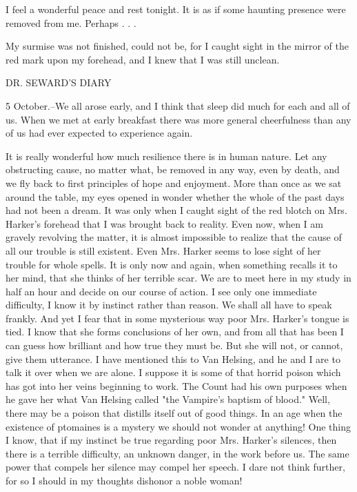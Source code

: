 I feel a wonderful peace and rest tonight. It is as if some haunting presence were removed from me. Perhaps . . . 

My surmise was not finished, could not be, for I caught sight in the mirror of the red mark upon my forehead, and I knew that I was still unclean. 

DR. SEWARD'S DIARY 

5 October.--We all arose early, and I think that sleep did much for each and all of us. When we met at early breakfast there was more general cheerfulness than any of us had ever expected to experience again. 

It is really wonderful how much resilience there is in human nature. Let any obstructing cause, no matter what, be removed in any way, even by death, and we fly back to first principles of hope and enjoyment. More than once as we sat around the table, my eyes opened in wonder whether the whole of the past days had not been a dream. It was only when I caught sight of the red blotch on Mrs. Harker's forehead that I was brought back to reality. Even now, when I am gravely revolving the matter, it is almost impossible to realize that the cause of all our trouble is still existent. Even Mrs. Harker seems to lose sight of her trouble for whole spells. It is only now and again, when something recalls it to her mind, that she thinks of her terrible scar. We are to meet here in my study in half an hour and decide on our course of action. I see only one immediate difficulty, I know it by instinct rather than reason. We shall all have to speak frankly. And yet I fear that in some mysterious way poor Mrs. Harker's tongue is tied. I know that she forms conclusions of her own, and from all that has been I can guess how brilliant and how true they must be. But she will not, or cannot, give them utterance. I have mentioned this to Van Helsing, and he and I are to talk it over when we are alone. I suppose it is some of that horrid poison which has got into her veins beginning to work. The Count had his own purposes when he gave her what Van Helsing called "the Vampire's baptism of blood." Well, there may be a poison that distills itself out of good things. In an age when the existence of ptomaines is a mystery we should not wonder at anything! One thing I know, that if my instinct be true regarding poor Mrs. Harker's silences, then there is a terrible difficulty, an unknown danger, in the work before us. The same power that compels her silence may compel her speech. I dare not think further, for so I should in my thoughts dishonor a noble woman! 

